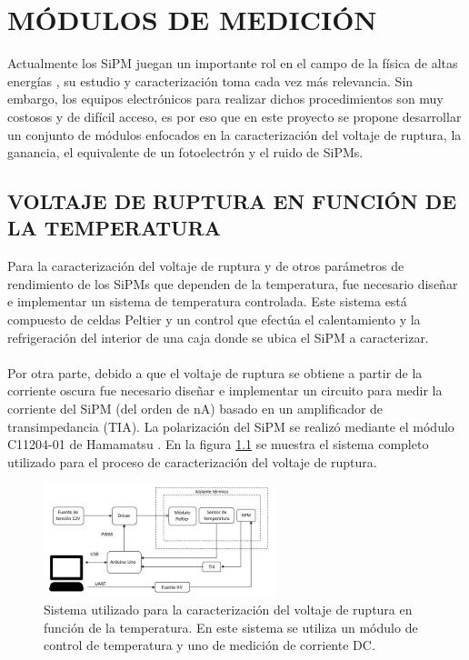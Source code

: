 \chapter{MÓDULOS DE MEDICIÓN}
\label{Cap:Modulos}
Actualmente los SiPM juegan un importante rol en el campo de la física de altas energías \citep{Intro_SIPM_Sensl}, su estudio y caracterización toma cada vez más relevancia. Sin embargo, los equipos electrónicos para realizar dichos procedimientos son muy costosos y de difícil acceso, es por eso que en este proyecto se propone desarrollar un conjunto de módulos enfocados en la caracterización del voltaje de ruptura, la ganancia, el equivalente de un fotoelectrón y el ruido de SiPMs.  
\section{VOLTAJE DE RUPTURA EN FUNCIÓN DE LA TEMPERATURA}
Para la caracterización del voltaje de ruptura y de otros parámetros de rendimiento de los SiPMs que dependen de la temperatura, fue necesario diseñar e implementar un sistema de temperatura controlada. Este sistema está compuesto de celdas Peltier y un control que efectúa el calentamiento y la refrigeración del interior de una caja donde se ubica el SiPM a caracterizar.\\ \\
Por otra parte, debido a que el  voltaje de ruptura se obtiene a partir de la corriente oscura fue necesario diseñar e  implementar un circuito para medir la corriente del SiPM (del orden de nA) basado en un amplificador de transimpedancia (TIA). La polarización del SiPM se realizó mediante el módulo C11204-01 de Hamamatsu \citep{Driver_mppc}. En la figura \ref{fig:complete_system} se muestra el sistema completo utilizado para el proceso de caracterización del voltaje de ruptura.
\begin{figure}[h!]
\begin{centering}
  \includegraphics[width=0.6\textwidth]{Images/Sistema_Completo_ruptura}
  \caption{Sistema utilizado para la caracterización del voltaje de ruptura en función de la temperatura. En este sistema se utiliza un módulo de control de temperatura y uno de medición de corriente DC.}
  \label{fig:complete_system}
  \par\end{centering}
\end{figure}

